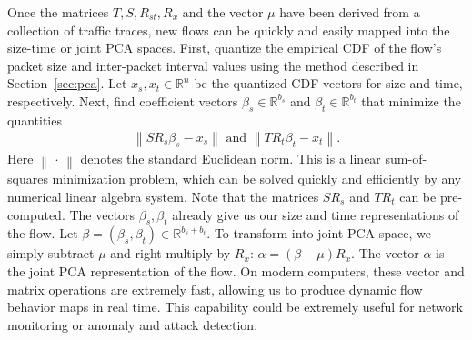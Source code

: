 \documentclass[conference]{IEEEtran}
\newcommand{\caps}[1]{{\small{#1}}}
\newcommand{\R}{\mathbb{R}}
\begin{document}
Once the matrices $T,S,R_{st},R_x$ and the vector $\mu$ have been derived from a collection of traffic traces, new flows can be quickly and easily mapped into the size-time or joint \caps{PCA} spaces. First, quantize the empirical \caps{CDF} of the flow's packet size and inter-packet interval values using the method described in Section~\ref{sec:pca}. Let $x_s, x_t \in \R^n$ be the quantized \caps{CDF} vectors for size and time, respectively. Next, find coefficient vectors $\beta_s \in \R^{b_s}$ and $\beta_t \in \R^{b_t}$ that minimize the quantities
\begin{align}
\left\| S R_s \beta_s - x_s \right\|
\text{ and }
\left\| T R_t \beta_t - x_t \right\|.
\end{align}
Here $\left\|\,\cdot\,\right\|$ denotes the standard Euclidean norm. This is a linear sum-of-squares minimization problem, which can be solved quickly and efficiently by any numerical linear algebra system. Note that the matrices $SR_s$ and $TR_t$ can be pre-computed. The vectors $\beta_s,\beta_t$ already give us our size and time representations of the flow. Let $\beta = (\beta_s,\beta_t) \in \R^{b_s+b_t}$. To transform into joint \caps{PCA} space, we simply subtract $\mu$ and right-multiply by $R_x$: $\alpha = \left(\beta-\mu\right) R_x$.
The vector $\alpha$ is the joint \caps{PCA} representation of the flow. On modern computers, these vector and matrix operations are extremely fast, allowing us to produce dynamic flow behavior maps in real time. This capability could be extremely useful for network monitoring or anomaly and attack detection.
\end{document}
